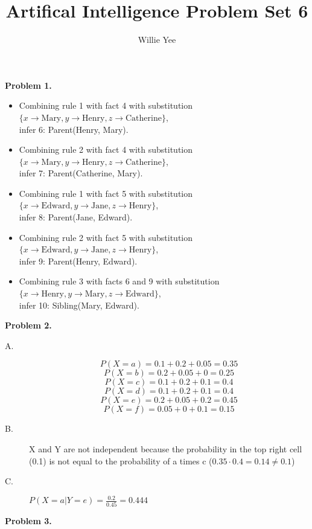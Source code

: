 \documentclass{article}
\begin{document}
\title{Artifical Intelligence Problem Set 6}
\date{}
\author{Willie Yee}
\maketitle
\noindent
\textbf{Problem 1.} 
\begin{itemize}
	\item Combining rule 1 with fact 4 with substitution $\{x\rightarrow\text{Mary},y\rightarrow\text{Henry},z\rightarrow\text{Catherine}\}$, \\
	infer 6: Parent(Henry, Mary).
	\item Combining rule 2 with fact 4 with substitution $\{x\rightarrow\text{Mary},y\rightarrow\text{Henry},z\rightarrow\text{Catherine}\}$, \\
	infer 7: Parent(Catherine, Mary).
	\item Combining rule 1 with fact 5 with substitution $\{x\rightarrow\text{Edward},y\rightarrow\text{Jane},z\rightarrow\text{Henry}\}$, \\
	infer 8: Parent(Jane, Edward).
	\item Combining rule 2 with fact 5 with substitution $\{x\rightarrow\text{Edward},y\rightarrow\text{Jane},z\rightarrow\text{Henry}\}$, \\
	infer 9: Parent(Henry, Edward).
	\item Combining rule 3 with facts 6 and 9 with substitution $\{x\rightarrow\text{Henry},y\rightarrow\text{Mary},z\rightarrow\text{Edward}\}$, \\
	infer 10: Sibling(Mary, Edward).
\end{itemize}
\textbf{Problem 2.}
\begin{description}
	\item [A.] $$P(X=a) = 0.1+0.2+0.05 = 0.35$$
$$P(X=b) = 0.2+0.05+0 = 0.25$$
$$P(X=c) = 0.1+0.2+0.1 = 0.4$$
$$P(X=d) = 0.1+0.2+0.1 = 0.4$$
$$P(X=e) = 0.2+0.05+0.2 = 0.45$$
$$P(X=f) = 0.05+0+0.1 = 0.15$$
	\item [B.] X and Y are not independent because the probability in the top right cell (0.1) is not equal to the probability of a times c ($0.35\cdot 0.4 =0.14 \neq 0.1$)
	\item [C.] $P(X=a|Y=e)=\frac{0.2}{0.45}=0.444$
\end{description}
\textbf{Problem 3.}
\end{document}
